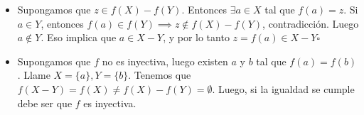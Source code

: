 \begin{sol}
	\begin{itemize}
		\item Supongamos que $z \in f(X) - f(Y)$. Entonces $\exists a \in X $ tal que $f(a) = z$. Si $a \in Y$, entonces $f(a) \in f(Y) \implies z\notin f(X)-f(Y)$, contradicci\'on. Luego $a\notin Y$. Eso implica que $a\in X-Y$, y por lo tanto $z = f(a) \in X-Y \square$
		\item Supongamos que $f$ no es inyectiva, luego existen $a$ y $b$ tal que $f(a) = f(b)$. Llame $X = \{a\}, Y = \{b\}$. Tenemos que $f(X-Y) = f(X) \neq f(X) - f(Y) = \emptyset$. Luego, si la igualdad se cumple debe ser que $f$ es inyectiva.
	\end{itemize}
\end{sol}
